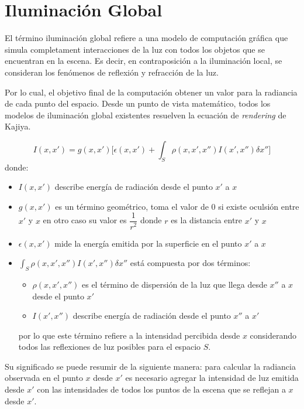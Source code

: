 \section{Iluminación Global}
\label{sec:ilumglobal}

El término iluminación global refiere a una modelo de
computación gráfica que simula completament interacciones de la luz con todos los objetos que se encuentran 
en la escena. Es decir, en contraposición a la iluminación local, se consideran los fenómenos de
reflexión y refracción de la luz.

Por lo cual, el objetivo final de la computación obtener un valor para la radiancia de cada punto del espacio. Desde un punto de vista
matemático, todos los modelos de iluminación global existentes resuelven la ecuación de \textit{rendering} de Kajiya.

\begin{equation}
    I(x,x') = g(x,x') \bigg[\epsilon(x,x') + \int_{S} \rho(x,x',x'')I(x',x'') \delta x''\bigg]
\end{equation}
donde:
\begin{itemize}
    \item $I(x,x')$ describe energía de radiación desde el punto $x'$ a $x$
    \item $g(x,x')$ es un término geométrico, toma el valor de $0$ si existe oculsión entre $x'$ y $x$ en otro caso su valor es $\dfrac{1}{r^{2}}$ donde $r$ es la distancia entre $x'$ y $x$
    \item $\epsilon(x,x')$ mide la energía emitida por la superficie en el punto $x'$ a $x$
    \item $\int_{S} \rho(x,x',x'')I(x',x'') \delta x''$ está compuesta por dos términos:
        \begin{itemize}
            \item $\rho(x,x',x'')$ es el término de dispersión de la luz que llega desde $x''$ a $x$ desde el punto $x'$
            \item $I(x',x'')$ describe energía de radiación desde el punto $x''$ a $x'$
        \end{itemize}
    por lo que este término refiere a la intensidad percibida desde $x$ considerando todos las reflexiones de
    luz posibles para el espacio $S$.
\end{itemize}

Su significado se puede resumir de la siguiente manera: para calcular la radiancia observada en el punto $x$ desde $x'$  es necesario agregar
la intensidad de luz emitida desde $x'$ con las intensidades de todos los puntos de la escena que se reflejan a $x$ desde $x'$.

